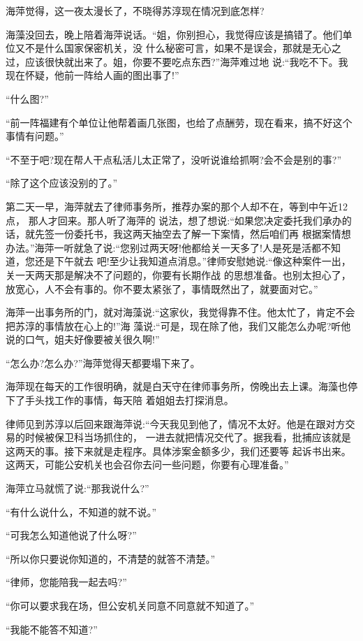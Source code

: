 \documentclass[11pt,a4paper,onecolumn]{article}
\begin{document}
海萍觉得，这一夜太漫长了，不晓得苏淳现在情况到底怎样?

海藻没回去，晚上陪着海萍说话。``姐，你别担心，我觉得应该是搞错了。他们单位又不是什么国家保密机关，没
什么秘密可言，如果不是误会，那就是无心之过，应该很快就出来了。姐，你要不要吃点东西?''海萍难过地
说:``我吃不下。我现在怀疑，他前一阵给人画的图出事了!''

``什么图?''

``前一阵福建有个单位让他帮着画几张图，也给了点酬劳，现在看来，搞不好这个事情有问题。''

``不至于吧?现在帮人干点私活儿太正常了，没听说谁给抓啊?会不会是别的事?''

``除了这个应该没别的了。''

第二天一早，海萍就去了律师事务所，推荐办案的那个人却不在，等到中午近12点， 那人才回来。那人听了海萍的
说法，想了想说:``如果您决定委托我们承办的话，就先签一份委托书，我这两天抽空去了解一下案情，然后咱们再
根据案情想办法。''海萍一听就急了说:``您别过两天呀!他都给关一天多了!人是死是活都不知道，您还是下午就去
吧!至少让我知道点消息。''律师安慰她说:``像这种案件一出，关一天两天那是解决不了问题的，你要有长期作战
的思想准备。也别太担心了，放宽心，人不会有事的。你不要太紧张了，事情既然出了，就要面对它。''

海萍一出事务所的门，就对海藻说:``这家伙，我觉得靠不住。他太忙了，肯定不会把苏淳的事情放在心上的!''海
藻说:``可是，现在除了他，我们又能怎么办呢?听他说的口气，姐夫好像要被关很久啊!''

``怎么办?怎么办?''海萍觉得天都要塌下来了。

海萍现在每天的工作很明确，就是白天守在律师事务所，傍晚出去上课。海藻也停下了手头找工作的事情，每天陪
着姐姐去打探消息。

律师见到苏淳以后回来跟海萍说:``今天我见到他了，情况不太好。他是在跟对方交易的时候被保卫科当场抓住的，
一进去就把情况交代了。据我看，批捕应该就是这两天的事。接下来就是走程序。具体涉案金额多少，我们还要等
起诉书出来。这两天，可能公安机关也会召你去问一些问题，你要有心理准备。''

海萍立马就慌了说:``那我说什么?''

``有什么说什么，不知道的就不说。''

``可我怎么知道他说了什么呀?''

``所以你只要说你知道的，不清楚的就答不清楚。''

``律师，您能陪我一起去吗?''

``你可以要求我在场，但公安机关同意不同意就不知道了。''

``我能不能答不知道?''
\end{document}

